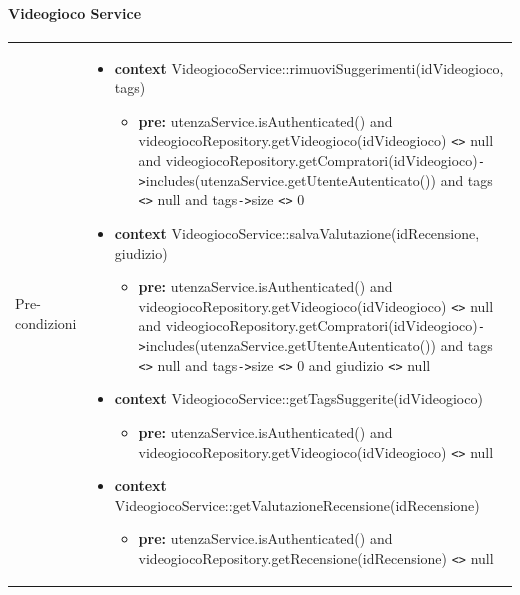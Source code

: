 \paragraph{Videogioco Service}
\small\begin{tabular}{|| l | p{28em} ||} 
	\hline
	Pre-condizioni & \begin{itemize}[leftmargin=*]
		\item \textbf{context} VideogiocoService::rimuoviSuggerimenti(idVideogioco, tags)
		\begin{itemize} \item[ ] \textbf{pre:} utenzaService.isAuthenticated() and videogiocoRepository.getVideogioco(idVideogioco) \verb|<>| null and videogiocoRepository\newline .getCompratori(idVideogioco)\verb|->|includes(\newline utenzaService.getUtenteAutenticato()) and tags \verb|<>| null and tags\verb|->|size \verb|<>| 0
		\end{itemize}

		\item \textbf{context} VideogiocoService::salvaValutazione(idRecensione, giudizio)
		\begin{itemize}
			\item[ ] \textbf{pre:} utenzaService.isAuthenticated() and videogiocoRepository.getVideogioco(idVideogioco) \verb|<>| null and videogiocoRepository\newline .getCompratori(idVideogioco)\verb|->|includes(\newline utenzaService.getUtenteAutenticato()) and tags \verb|<>| null and tags\verb|->|size \verb|<>| 0 and giudizio \verb|<>| null
		\end{itemize}

		\item \textbf{context} VideogiocoService::getTagsSuggerite(idVideogioco)
		\begin{itemize}
			\item[ ] \textbf{pre:} utenzaService.isAuthenticated() and videogiocoRepository.getVideogioco(idVideogioco) \verb|<>| null
		\end{itemize}

		\item \textbf{context} VideogiocoService::\newline getValutazioneRecensione(idRecensione)
		\begin{itemize}
			\item[ ] \textbf{pre:} utenzaService.isAuthenticated() and videogiocoRepository.getRecensione(idRecensione) \verb|<>| null
		\end{itemize}


\end{itemize}
\end{tabular}
